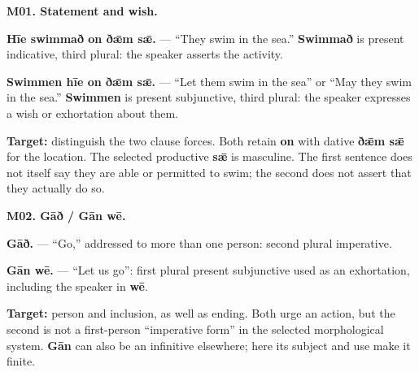 \par\begin{minipage}{\linewidth}\raggedright
\textbf{M01. Statement and wish.}

\textbf{Hīe swimmað on ðǣm sǣ.} — “They swim in the sea.” \textbf{Swimmað} is present indicative, third plural: the speaker asserts the activity.

\textbf{Swimmen hīe on ðǣm sǣ.} — “Let them swim in the sea” or “May they swim in the sea.” \textbf{Swimmen} is present subjunctive, third plural: the speaker expresses a wish or exhortation about them.

\textbf{Target:} distinguish the two clause forces. Both retain \textbf{on} with dative \textbf{ðǣm sǣ} for the location. The selected productive \textbf{sǣ} is masculine. The first sentence does not itself say they are able or permitted to swim; the second does not assert that they actually do so.

\end{minipage}\par\addvspace{4pt}

\par\begin{minipage}{\linewidth}\raggedright
\textbf{M02. Gāð /\allowbreak{} Gān wē.}

\textbf{Gāð.} — “Go,” addressed to more than one person: second plural imperative.

\textbf{Gān wē.} — “Let us go”: first plural present subjunctive used as an exhortation, including the speaker in \textbf{wē}.

\textbf{Target:} person and inclusion, as well as ending. Both urge an action, but the second is not a first-person “imperative form” in the selected morphological system. \textbf{Gān} can also be an infinitive elsewhere; here its subject and use make it finite.

\end{minipage}\par\addvspace{4pt}

